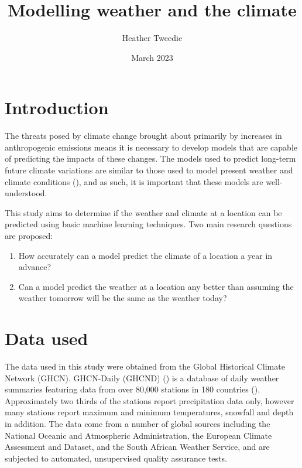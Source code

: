 \documentclass[12pt]{article}
\title{Modelling weather and the climate}
\author{Heather Tweedie}
\date{March 2023}
\begin{document}
\markboth{\theauthor}{\thetitle}

\maketitle

\section{Introduction}

The threats posed by climate change brought about primarily by increases in anthropogenic emissions means it is necessary to develop models that are capable of predicting the impacts of these changes. The models used to predict long-term future climate variations are similar to those used to model present weather and climate conditions (\cite{raisanen_2007_how}), and as such, it is important that these models are well-understood.

This study aims to determine if the weather and climate at a location can be predicted using basic machine learning techniques. Two main research questions are proposed:

\begin{enumerate}
  \item How accurately can a model predict the climate of a location a year in advance?
  \item Can a model predict the weather at a location any better than assuming the weather tomorrow            will be the same as the weather today?
\end{enumerate}

\section{Data used}

    The data used in this study were obtained from the Global Historical Climate Network (GHCN). GHCN-Daily (GHCND) (\cite{menne_2012_global}) is a database of daily weather summaries featuring data from over 80,000 stations in 180 countries (\cite{menne_2012_an}). Approximately two thirds of the stations report precipitation data only, however many stations report maximum and minimum temperatures, snowfall and depth in addition. The data come from a number of global sources including the National Oceanic and Atmospheric Administration, the European Climate Assessment and Dataset, and the South African Weather Service, and are subjected to automated, unsupervised quality assurance tests.
    
\end{document}
